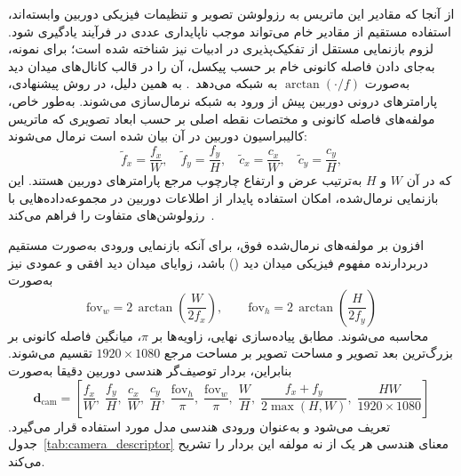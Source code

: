 از آنجا که مقادیر این ماتریس به رزولوشن تصویر و تنظیمات فیزیکی دوربین وابسته‌اند، استفاده مستقیم از مقادیر خام می‌تواند موجب ناپایداری عددی در فرآیند یادگیری شود. لزوم بازنمایی مستقل از تفکیک‌پذیری در ادبیات نیز شناخته شده است؛ برای نمونه،  به‌جای دادن فاصله کانونی خام بر حسب پیکسل، آن را در قالب کانال‌های میدان دید به‌صورت $\arctan(\cdot/f)$ به شبکه می‌دهد~\cite{Facil2019CAMConvs}. به همین دلیل، در روش پیشنهادی، پارامترهای درونی دوربین پیش از ورود به شبکه نرمال‌سازی می‌شوند. به‌طور خاص، مولفه‌های فاصله کانونی و مختصات نقطه اصلی بر حسب ابعاد تصویری که ماتریس کالیبراسیون دوربین در آن بیان شده است نرمال می‌شوند:
\begin{equation}
\tilde{f}_x = \frac{f_x}{W}, \quad
\tilde{f}_y = \frac{f_y}{H}, \quad
\tilde{c}_x = \frac{c_x}{W}, \quad
\tilde{c}_y = \frac{c_y}{H},
\end{equation}
که در آن $W$ و $H$ به‌ترتیب عرض و ارتفاع چارچوب مرجع پارامترهای دوربین هستند. این بازنمایی نرمال‌شده، امکان استفاده پایدار از اطلاعات دوربین در مجموعه‌داده‌هایی با رزولوشن‌های متفاوت را فراهم می‌کند~\cite{Facil2019CAMConvs,Piccinelli2024UniDepth}.

افزون بر مولفه‌های نرمال‌شده فوق، برای آنکه بازنمایی ورودی به‌صورت مستقیم دربردارنده مفهوم فیزیکی میدان دید () باشد، زوایای میدان دید افقی و عمودی نیز به‌صورت
\begin{equation}
\mathrm{fov}_w = 2\,\arctan\!\left(\frac{W}{2 f_x}\right), \qquad
\mathrm{fov}_h = 2\,\arctan\!\left(\frac{H}{2 f_y}\right)
\end{equation}
محاسبه می‌شوند. مطابق پیاده‌سازی نهایی، زاویه‌ها بر $\pi$، میانگین فاصله کانونی بر بزرگ‌ترین بعد تصویر و مساحت تصویر بر مساحت مرجع $1920\times1080$ تقسیم می‌شوند. بنابراین، بردار توصیف‌گر هندسی دوربین دقیقا به‌صورت
\begin{equation}
\mathbf{d}_{\mathrm{cam}} = \left[\frac{f_x}{W},\;\frac{f_y}{H},\;\frac{c_x}{W},\;\frac{c_y}{H},\;
\frac{\mathrm{fov}_h}{\pi},\;\frac{\mathrm{fov}_w}{\pi},\;\frac{W}{H},\;
\frac{f_x+f_y}{2\max(H,W)},\;\frac{HW}{1920\times1080}\right]
\label{eq:camera_descriptor}
\end{equation}
تعریف می‌شود و به‌عنوان ورودی هندسی مدل مورد استفاده قرار می‌گیرد.
جدول~\ref{tab:camera_descriptor} معنای هندسی هر یک از نه مولفه این بردار را
تشریح می‌کند.

